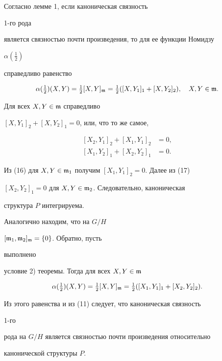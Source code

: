 \begin{pf} Согласно лемме 1, если каноническая связность 


1-го рода 


является связностью почти произведения, то для ее функции Номидзу 


$\alpha(\frac{1}{2})$ 


справедливо равенство 


$$ 


\alpha(\tfrac{1}{2})(X,Y)=\tfrac{1}{2}[X,Y]_{\frak m}=


\tfrac{1}{2} 


([X,Y_1]_1+[X,Y_2]_2),\quad X,Y\in\frak m. 


$$ 


Для всех $X,Y\in\frak m$ справедливо 


$[X,Y_1]_2+[X,Y_2]_1=0$, или, что то же самое,


\begin{align} 


[X_2,Y_1]_2+[X_1,Y_1]_2&=0, \\ 


[X_1,Y_2]_1+[X_2,Y_2]_1&=0. 


\end{align} 


Из (16) для $X,Y\in\frak m_1$ получим $[X_1,Y_1]_2=0$. Далее из (17) 


$[X_2,Y_2]_1=0$ для $X,Y\in\frak m_2$. Следовательно, каноническая 


структура $P$ интегрируема. 


Аналогично находим, что на $G/H$\; 


$[\frak m_1,\frak m_2]_{\frak m}=\{0\}$. Обратно, пусть 


выполнено 


условие 2) теоремы. Тогда для всех $X,Y\in\frak m$ 


$$ 


\alpha(\tfrac{1}{2})(X,Y)=\tfrac{1}{2}[X,Y]_{\frak m}= 


\tfrac{1}{2}([X_1,Y_1]_1+[X_2,Y_2]_2). 


$$ 


Из этого равенства и из (11) следует, что каноническая связность 


1-го 


рода на $G/H$ является связностью почти произведения относительно 


канонической структуры $P$. 


\end{pf} 


